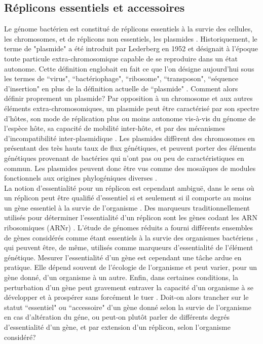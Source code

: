  
 \subsection{Réplicons essentiels et accessoires}\label{essacc}
Le génome bactérien est constitué de réplicons essentiels à la survie des cellules, les chromosomes, et de réplicons non essentiels, les plasmides \citep{Mackenzie2004multiple}. Historiquement, le terme de "plasmide" a été introduit par Lederberg en 1952 \citep{lederberg1952cell} et désignait à l'époque toute particule extra-chromosomique capable de se reproduire dans un état autonome. Cette définition englobait en fait ce que l'on désigne aujourd'hui sous les termes de ``virus", ``bactériophage", ``ribosome", ``transposon", ``séquence d'insertion" en plus de la définition actuelle de ``plasmide" \citep{lederberg1952cell}. Comment alors définir proprement un plasmide? Par opposition à un chromosome et aux autres éléments extra-chromosomiques, un plasmide peut être caractérisé par son spectre d'hôtes, son mode de réplication plus ou moins autonome vis-à-vis du génome de l'espèce hôte, sa capacité de mobilité inter-hôte, et par des mécanismes d'incompatibilité inter-plasmidique \citep{Slater2008,helinski2004introduction}. Les plasmides diffèrent des chromosomes en présentant des très hauts taux de flux génétiques, et peuvent porter des éléments génétiques provenant de bactéries qui n'ont pas ou peu de caractéristiques en commun. Les plasmides peuvent donc être vus comme des mosaïques de modules fonctionnels aux origines phylogéniques diverses \citep{Fernandez-Lopez2006}.\\
	La notion d'essentialité pour un réplicon est cependant ambiguë, dans le sens où un réplicon peut être qualifié d'essentiel si et seulement si il comporte au moins un gène essentiel à la survie de l'organisme \citep{Mackenzie2004multiple}. Des marqueurs traditionnellement utilisés pour déterminer l'essentialité d'un réplicon sont les gènes codant les ARN ribosomiques (ARNr) \citep{Mackenzie2004multiple}. L'étude de génomes réduits a fourni différents ensembles de gènes considérés comme étant essentiels à la survie des organismes bactériens \citep{Glass2006,Koonin2000}, qui peuvent être, de même, utilisés comme marqueurs d'essentialité de l'élément génétique. Mesurer l'essentialité d'un gène est cependant une tâche ardue en pratique. Elle dépend souvent de l'écologie de l'organisme et peut varier, pour un gène donné, d'un organisme à un autre. Enfin, dans certaines conditions, la perturbation d'un gène peut gravement entraver la capacité d'un organisme à se développer et à prospérer sans forcément le tuer \citep{Mackenzie2004multiple,Slater2008}. Doit-on alors trancher sur le statut ``essentiel" ou ``accessoire" d'un gène donné selon la survie de l'organisme en cas d'altération du géne, ou peut-on plutôt parler de différents degrés d'essentialité d'un gène, et par extension d'un réplicon, selon l'organisme considéré?
 
